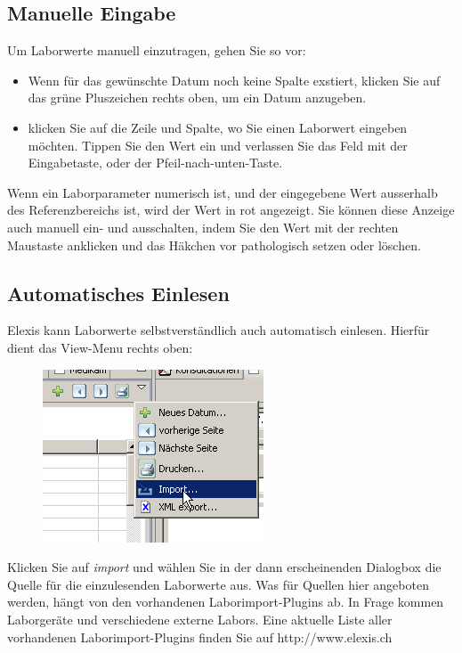 \subsection{Manuelle Eingabe}
Um Laborwerte manuell einzutragen, gehen Sie so vor:
\begin{itemize}
    \item Wenn für das gewünschte Datum noch keine Spalte exstiert, klicken Sie auf das grüne Pluszeichen rechts oben, um ein Datum anzugeben.
    \item klicken Sie auf die Zeile und Spalte, wo Sie einen Laborwert eingeben möchten. Tippen Sie den Wert ein und verlassen Sie das Feld mit der Eingabetaste, oder der Pfeil-nach-unten-Taste.
\end{itemize}
Wenn ein Laborparameter numerisch ist, und der eingegebene Wert ausserhalb des Referenzbereichs ist, wird der Wert in rot angezeigt. Sie können diese Anzeige auch manuell ein- und ausschalten, indem Sie den Wert mit der rechten Maustaste anklicken und das Häkchen vor \glqq pathologisch\grqq{} setzen oder löschen.

\subsection{Automatisches Einlesen}
Elexis kann Laborwerte selbstverständlich auch automatisch einlesen. Hierfür dient das View-Menu rechts oben:\\
\begin{figure}
    \includegraphics{images/labor6}
\end{figure}
Klicken Sie auf \textit{import} und wählen Sie in der dann erscheinenden Dialogbox die Quelle für die einzulesenden Laborwerte aus. Was für Quellen hier angeboten werden, hängt von den vorhandenen Laborimport-Plugins ab. In Frage kommen Laborgeräte und verschiedene externe Labors. Eine aktuelle Liste aller vorhandenen Laborimport-Plugins finden Sie auf http://www.elexis.ch

